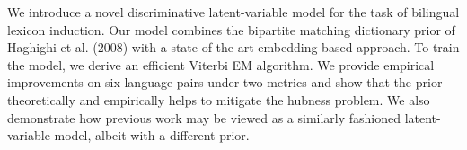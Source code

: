 We introduce a novel discriminative latent-variable model for the task of bilingual lexicon induction. Our model combines the bipartite matching dictionary prior of Haghighi et al. (2008) with a state-of-the-art embedding-based approach. To train the model, we derive an efficient Viterbi EM algorithm. We provide empirical improvements on six language pairs under two metrics and show that the prior theoretically and empirically helps to mitigate the hubness problem. We also demonstrate how previous work may be viewed as a similarly fashioned latent-variable model, albeit with a different prior.
